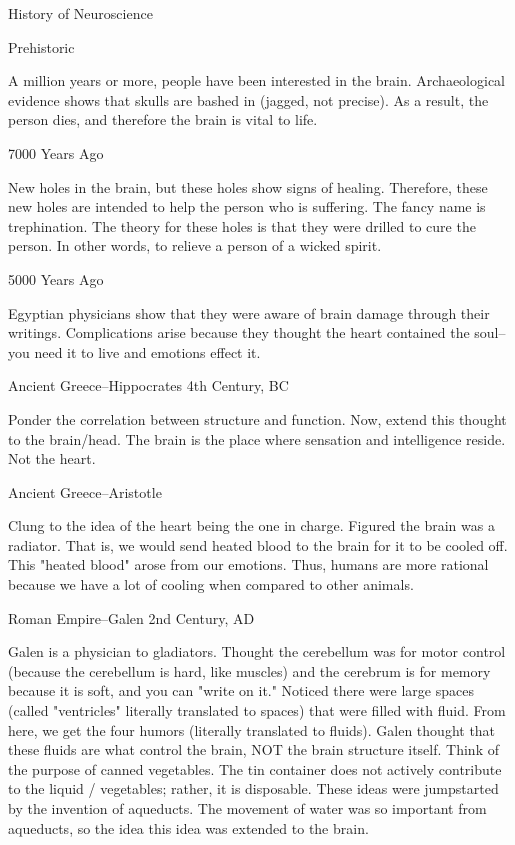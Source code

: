 History of Neuroscience

Prehistoric

A million years or more, people have been interested in the brain. Archaeological evidence shows that skulls are bashed in (jagged, not precise). As a result, the person dies, and therefore the brain is vital to life. 

7000 Years Ago

New holes in the brain, but these holes show signs of healing. Therefore, these new holes are intended to help the person who is suffering.
The fancy name is trephination. 
The theory for these holes is that they were drilled to cure the person. In other words, to relieve a person of a wicked spirit. 

5000 Years Ago

Egyptian physicians show that they were aware of brain damage through their writings.
Complications arise because they thought the heart contained the soul--you need it to live and emotions effect it.

Ancient Greece--Hippocrates 4th Century, BC

Ponder the correlation between structure and function. Now, extend this thought to the brain/head.
The brain is the place where sensation and intelligence reside. Not the heart.

Ancient Greece--Aristotle

Clung to the idea of the heart being the one in charge. 
Figured the brain was a radiator. That is, we would send heated blood to the brain for it to be cooled off. This "heated blood" arose from our emotions. Thus, humans are more rational because we have a lot of cooling when compared to other animals.

Roman Empire--Galen 2nd Century, AD

Galen is a physician to gladiators. 
Thought the cerebellum was for motor control (because the cerebellum is hard, like muscles) and the cerebrum is for memory because it is soft, and you can "write on it."
Noticed there were large spaces (called "ventricles" literally translated to spaces) that were filled with fluid.
From here, we get the four humors (literally translated to fluids).
Galen thought that these fluids are what control the brain, NOT the brain structure itself. Think of the purpose of canned vegetables. The tin container does not actively contribute to the liquid / vegetables; rather, it is disposable.
These ideas were jumpstarted by the invention of aqueducts. The movement of water was so important from aqueducts, so the idea this idea was extended to the brain.

